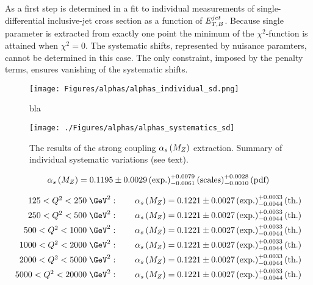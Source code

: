 As a first step \asz is determined in a fit to individual measurements of single-differential inclusive-jet cross section as a function of $\mbox{$E_{T,B}^{jet}$}$. Because single parameter is extracted from exactly one point the minimum of the $\chi^2$-function is attained when $\chi^2=0$. The systematic shifts, represented by nuisance paramters, cannot be determined in this case. The only constraint, imposed by the penalty terms, ensures vanishing of the systematic shifts.

\begin{figure}[htp]
 \begin{center}
 \texttt{[image: Figures/alphas/alphas\_individual\_sd.png]}
\end{center}
 \caption{bla}
 \label{fig:alphassinglediffindividual}
\end{figure}


\begin{figure}[th!]
\centering
\texttt{[image: ./Figures/alphas/alphas\_systematics\_sd]}
\caption{The results of the strong coupling $\mbox{$\alpha_{s}\left(M_{Z}\right)$}$ extraction. Summary of individual systematic variations (see text).}
\label{fig:alphas_systematics}
\end{figure}

\begin{equation}
 \mbox{$\alpha_{s}\left(M_{Z}\right)$} = 0.1195 \pm 0.0029 \left( \text{exp.} \right) ^{+0.0079}_{-0.0061} \left( \text{scales} \right) ^{+0.0028}_{-0.0010} \left( \text{pdf}\right)
\end{equation}


\begin{align}
	125 < \qsq < 250\;\GeV^2:\qquad \asz &= 0.1221 \pm 0.0027 \left( \text{exp.} \right) ^{+0.0033}_{-0.0044} \left( \text{th.} \right) \notag \\
	250 < \qsq < 500\;\GeV^2:\qquad \asz &= 0.1221 \pm 0.0027 \left( \text{exp.} \right) ^{+0.0033}_{-0.0044} \left( \text{th.} \right) \notag \\
	500 < \qsq < 1000\;\GeV^2:\qquad \asz &= 0.1221 \pm 0.0027 \left( \text{exp.} \right) ^{+0.0033}_{-0.0044} \left( \text{th.} \right) \notag \\
	1000 < \qsq < 2000\;\GeV^2:\qquad \asz &= 0.1221 \pm 0.0027 \left( \text{exp.} \right) ^{+0.0033}_{-0.0044} \left( \text{th.} \right) \notag \\
	2000 < \qsq < 5000\;\GeV^2:\qquad \asz &= 0.1221 \pm 0.0027 \left( \text{exp.} \right) ^{+0.0033}_{-0.0044} \left( \text{th.} \right) \notag \\
	5000 < \qsq < 20000\;\GeV^2:\qquad \asz &= 0.1221 \pm 0.0027 \left( \text{exp.} \right) ^{+0.0033}_{-0.0044} \left( \text{th.} \right) 	
\end{align}
